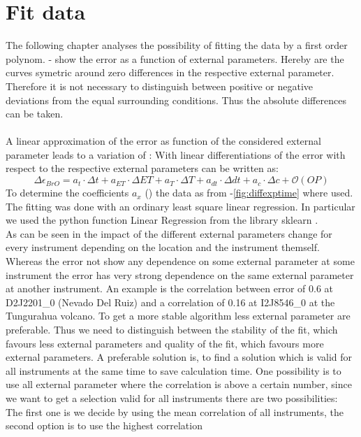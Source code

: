 \documentclass  [
  paper    = a4,
  BCOR     = 10mm,
  twoside,
  fontsize = 12pt,
  fleqn,
  toc      = bibnumbered,
  toc      = listofnumbered,
  numbers  = noendperiod,
  headings = normal,
  listof   = leveldown,
  version  = 3.03
]                                       {scrreprt}
\begin{document}
	
	\section{Fit data}
	The following chapter analyses the possibility of fitting the data by a first order polynom. - show the   error as a function of external parameters. Hereby are the curves symetric around zero differences in the respective external parameter. Therefore it is not necessary to distinguish between positive or negative deviations from the equal surrounding conditions. Thus the absolute differences can be taken.\\
	\\
	A linear approximation of the   error as function of the considered external parameter leads to a variation of   :
	With linear differentiations of the   error with respect to the respective external parameters  can be written as:	
	\begin{equation}
		\Delta \epsilon_{BrO} = a_{t}\cdot\Delta t+a_{ET}\cdot\Delta ET+a_{T}\cdot\Delta T+a_{dt}\cdot\Delta dt +a_{c}\cdot\Delta c + \mathcal{O}\left(OP\right)
		\label{calc:delterr}
	\end{equation}
	To determine the coefficients $a_{x}$ () the data as from -\ref{fig:diffexptime} where used.  The fitting was done with an ordinary least square linear regression. In particular we used the python function Linear Regression from the library sklearn \citep{SKlearn}. \\
	
	As can be seen in  the impact of the different external parameters change for every instrument depending on the location and the instrument themself. 
	Whereas the   error not show any dependence on some external parameter at some instrument the error has very strong dependence on the same external parameter at another instrument. An example is the correlation between   error of 0.6 at D2J2201\_0 (Nevado Del Ruiz) and a correlation of 0.16 at I2J8546\_0 at the Tungurahua volcano.
	To get a more stable algorithm less external parameter are preferable. Thus we need to distinguish between the stability of the fit, which favours less external parameters and quality of the fit, which favours more external parameters. 
	A preferable solution is, to find a solution which is valid for all instruments at the same time to save calculation time. 
	One possibility is to use all external parameter where the correlation is above a certain number, since we want to get a selection valid for all instruments there are two possibilities: The first one is we decide by using the mean correlation of all instruments, the second option is to use the highest correlation
	
\end{document}
